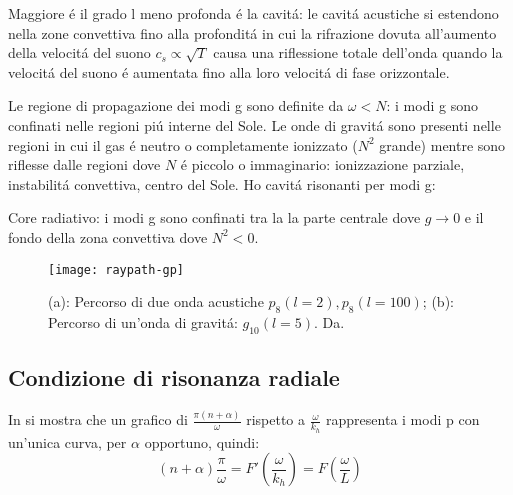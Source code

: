 \documentclass[../main.tex]{subfiles}
\begin{document}
Maggiore \'e il grado l meno profonda \'e la cavit\'a: le cavit\'a acustiche si estendono nella zone convettiva fino alla profondit\'a in cui la rifrazione dovuta all'aumento della velocit\'a del suono $c_s\propto\sqrt{T}$ causa una riflessione totale dell'onda quando la velocit\'a del suono \'e aumentata fino alla loro velocit\'a di fase orizzontale.


Le regione di propagazione dei modi g sono definite da $\omega<N$: i modi g sono confinati nelle regioni pi\'u interne del Sole.
Le onde di gravit\'a sono presenti nelle regioni in cui il gas \'e neutro o completamente ionizzato ($N^2$ grande) mentre sono riflesse dalle regioni dove $N$ \'e piccolo o immaginario: ionizzazione parziale, instabilit\'a convettiva, centro del Sole.
Ho cavit\'a risonanti per modi g:

Core radiativo: i modi g sono confinati tra la la parte centrale dove $g\to0$ e il fondo della zona convettiva dove $N^2<0$.



\begin{figure}
\texttt{[image: raypath-gp]}
\caption{(a): Percorso di due onda acustiche $p_8(l=2), p_8(l=100)$; (b): Percorso di un'onda di gravit\'a: $g_{10}(l=5)$. Da\cite{gou91seismic}.}
\end{figure}

\subsection{Condizione di risonanza radiale}

In \citet{duv82dispersion} si mostra che un grafico di $\frac{\pi(n+\alpha)}{\omega}$ rispetto a $\frac{\omega}{k_h}$ rappresenta i modi p con un'unica curva, per $\alpha$ opportuno, quindi:
\begin{equation}
(n+\alpha)\frac{\pi}{\omega}=F'(\frac{\omega}{k_h})=F(\frac{\omega}{L})\label{eq:duvallr}
\end{equation}
\end{document}

